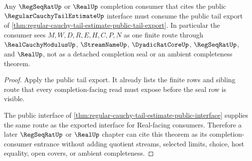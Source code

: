 \begin{theorem}
\label{thm:regular-cauchy-tail-estimate-completion-consumer-route}
Any $\RegSeqRatUp$ or $\RealUp$ completion consumer that cites the public $\RegularCauchyTailEstimateUp$ interface must consume the public tail export of \autoref{thm:regular-cauchy-tail-estimate-public-tail-export}. In particular the consumer sees $M,W,D,R,E,H,C,P,N$ as one finite route through $\RealCauchyModulusUp$, $\StreamNameUp$, $\DyadicRatCoreUp$, $\RegSeqRatUp$, and $\RealUp$, not as a detached completion seal or an ambient completeness theorem.
\end{theorem}
\begin{proof}
Apply the public tail export. It already lists the finite rows and sibling route that every completion-facing read must expose before the seal row is visible.

The public interface of \autoref{thm:regular-cauchy-tail-estimate-public-interface} supplies the same route as the exported interface for Real-facing consumers. Therefore a later $\RegSeqRatUp$ or $\RealUp$ chapter can cite this theorem as its completion-consumer entrance without adding quotient streams, selected limits, choice, host equality, open covers, or ambient completeness.
\end{proof}

